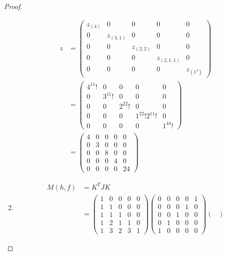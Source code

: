 \documentclass[12pt]{extarticle}
\newcommand{\<}{\langle}
\renewcommand{\>}{\rangle}
\theoremstyle{definition}
\begin{document}
\begin{proof}
\begin{enumerate}
\begin{align*}
      z
      &=
      \begin{pmatrix}
        z_{(4)} & 0 & 0 & 0 & 0 \\
        0 & z_{(3,1)} & 0 & 0 & 0 \\
        0 & 0 & z_{(2,2)} & 0 & 0 \\
        0 & 0 & 0 & z_{(2,1,1)} & 0 \\
        0 & 0 & 0 & 0 & z_{(1^4)}
      \end{pmatrix} \\
      &=
      \begin{pmatrix}
        4^11! & 0 & 0 & 0 & 0 \\
        0 & 3^11! & 0 & 0 & 0 \\
        0 & 0 & 2^22! & 0 & 0 \\
        0 & 0 & 0 & 1^22!2^11! & 0 \\
        0 & 0 & 0 & 0 & 1^44!
      \end{pmatrix} \\
      &=
      \begin{pmatrix}
        4 & 0 & 0 & 0 & 0 \\
        0 & 3 & 0 & 0 & 0 \\
        0 & 0 & 8 & 0 & 0 \\
        0 & 0 & 0 & 4 & 0 \\
        0 & 0 & 0 & 0 & 24
      \end{pmatrix}
    \end{align*}
  \item
    \begin{align*}
      M(h,f) &= 
      K^TJK \\
      &=
      \begin{pmatrix}
        1 & 0 & 0 & 0 & 0 \\
        1 & 1 & 0 & 0 & 0 \\
        1 & 1 & 1 & 0 & 0 \\
        1 & 2 & 1 & 1 & 0 \\
        1 & 3 & 2 & 3 & 1 
      \end{pmatrix}
      \begin{pmatrix}
        0 & 0 & 0 & 0 & 1 \\
        0 & 0 & 0 & 1 & 0 \\
        0 & 0 & 1 & 0 & 0 \\
        0 & 1 & 0 & 0 & 0 \\
        1 & 0 & 0 & 0 & 0
      \end{pmatrix}
      \begin{pmatrix}

\end{pmatrix}
\end{align*}
\end{enumerate}
\end{proof}
\end{document}
